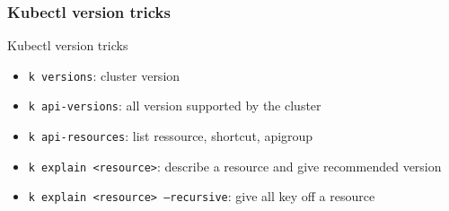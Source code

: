 \subsubsection{Kubectl version tricks}
\begin{frame}{Kubectl version tricks}
  \begin{itemize}
    \item \texttt{k versions}: cluster version
    \item \texttt{k api-versions}: all version supported by the cluster
    \item \texttt{k api-resources}: list ressource, shortcut, apigroup
    \item \texttt{k explain <resource>}: describe a resource and give recommended version
    \item \texttt{k explain <resource> --recursive}: give all key off a resource
  \end{itemize}
\end{frame}
